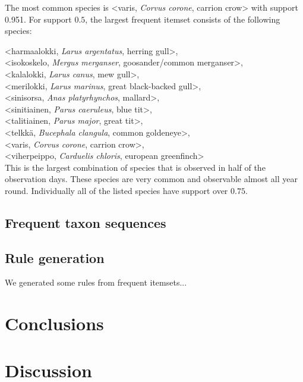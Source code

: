 \documentclass[english]{tktltiki2}
\begin{document}
The most common species is <varis, \emph{Corvus corone}, carrion crow> with support 0.951. For support $0.5$, the largest frequent itemset consists of the following species:

\hangindent=0.7cm
<harmaalokki, \emph{Larus argentatus}, herring gull>, \\
<isokoskelo, \emph{Mergus merganser}, goosander/common merganser>, \\
<kalalokki, \emph{Larus canus}, mew gull>, \\
<merilokki, \emph{Larus marinus}, great black-backed gull>, \\
<sinisorsa, \emph{Anas platyrhynchos}, mallard>, \\
<sinitiainen, \emph{Parus caeruleus}, blue tit>, \\
<talitiainen, \emph{Parus major}, great tit>, \\
<telkkä, \emph{Bucephala clangula}, common goldeneye>, \\
<varis, \emph{Corvus corone}, carrion crow>, \\
<viherpeippo, \emph{Carduelis chloris}, european greenfinch> \\

This is the largest combination of species that is observed in half of the observation days. These species are very common and observable almost all year round. Individually all of the listed species have support over $0.75$.


\subsection{Frequent taxon sequences}


\subsection{Rule generation}

We generated some rules from frequent itemsets... %

\section{Conclusions}



\section{Discussion}



\pagebreak

%
%
% 
%




\lastpage
\end{document}
